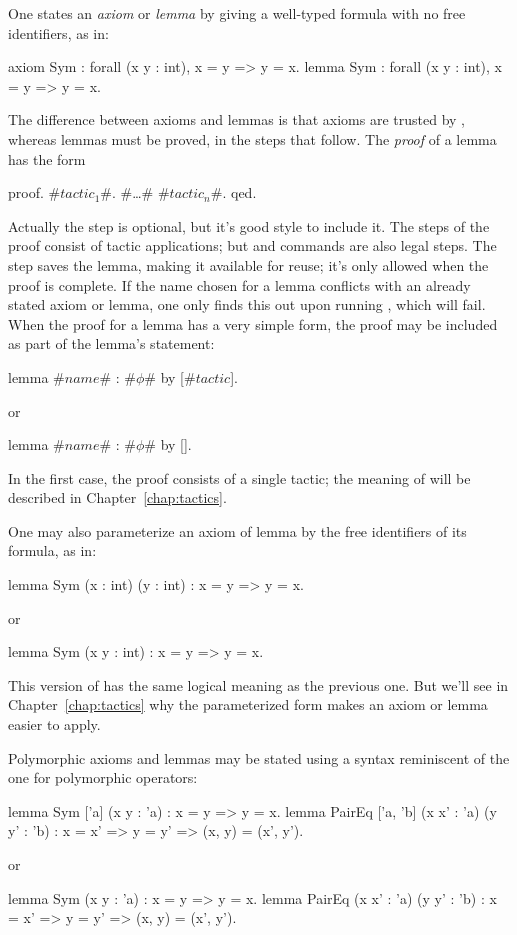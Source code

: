 One states an \emph{axiom} or \emph{lemma} by giving a well-typed formula with
no free identifiers, as in:
\begin{easycrypt}{}{}
axiom Sym : forall (x y : int), x = y => y = x.
lemma Sym : forall (x y : int), x = y => y = x.
\end{easycrypt}
The difference between axioms and lemmas is that axioms are trusted
by \EasyCrypt, whereas lemmas must be proved, in the steps that
follow. The \emph{proof} of a lemma has the form
\begin{easycrypt}{}{}
proof.
#$\mathit{tactic}_1$#. #\ldots# #$\mathit{tactic}_n$#.
qed.
\end{easycrypt}
Actually the  step is optional, but it's good style to include
it. The steps of the proof consist of tactic applications; but
 and  commands are also legal steps.
The  step saves the lemma, making it available for reuse;
it's only allowed when the proof is complete.
If the name chosen for a lemma conflicts with an already stated
axiom or lemma, one only finds this out upon running , which
will fail.
When the proof for a lemma has a very simple form, the proof may be
included as part of the lemma's statement:
\begin{easycrypt}{}{}
lemma #$\mathit{name}$# : #$\phi$# by [#$\mathit{tactic}$].
\end{easycrypt}
or
\begin{easycrypt}{}{}
lemma #$\mathit{name}$# : #$\phi$# by [].
\end{easycrypt}
In the first case, the proof consists of a single tactic; the meaning of
 will be described in Chapter~\ref{chap:tactics}.

One may also parameterize an axiom of lemma by the free identifiers of
its formula, as in:
\begin{easycrypt}{}{}
lemma Sym (x : int) (y : int) : x = y => y = x.
\end{easycrypt}
or
\begin{easycrypt}{}{}
lemma Sym (x y : int) : x = y => y = x.
\end{easycrypt}
This version of  has the same logical meaning as the previous
one. But we'll see in Chapter~\ref{chap:tactics} why the
parameterized form makes an axiom or lemma easier to apply.

Polymorphic axioms and lemmas may be stated using a syntax reminiscent
of the one for polymorphic operators:
\begin{easycrypt}{}{}
lemma Sym ['a] (x y : 'a) : x = y => y = x.
lemma PairEq ['a, 'b] (x x' : 'a) (y y' : 'b) :
  x = x' => y = y' => (x, y) = (x', y').
\end{easycrypt}
or
\begin{easycrypt}{}{}
lemma Sym (x y : 'a) : x = y => y = x.
lemma PairEq (x x' : 'a) (y y' : 'b) :
  x = x' => y = y' => (x, y) = (x', y').
\end{easycrypt}

